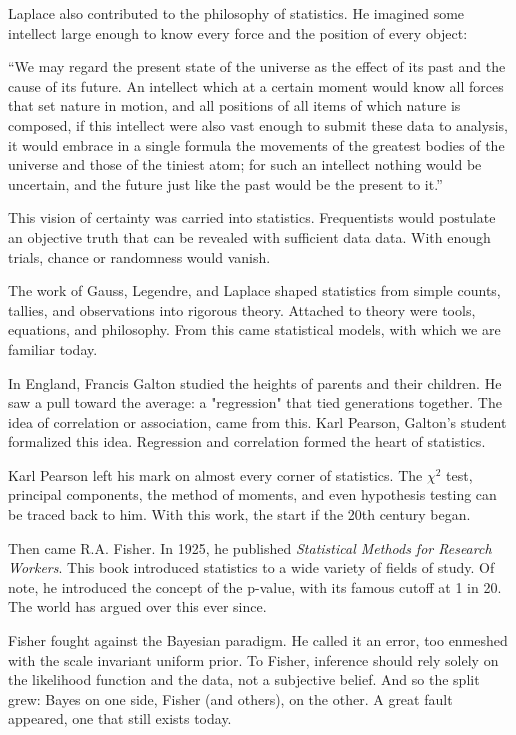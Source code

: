 Laplace also contributed to the philosophy of statistics.  
He imagined some intellect large enough to know every force and the position of every object:

\begin{displayquote} “We may regard the present state of the universe as the effect of its past and the cause of its future. 
    An intellect which at a certain moment would know all forces that set nature in motion, and all positions of all items 
    of which nature is composed, if this intellect were also vast enough to submit these data to analysis, 
    it would embrace in a single formula the movements of the greatest bodies of the universe 
    and those of the tiniest atom; for such an intellect nothing would be uncertain, 
    and the future just like the past would be the present to it.”
\end{displayquote}

This vision of certainty was carried into statistics.  
Frequentists would postulate an objective truth that can be revealed with sufficient data data.  
With enough trials, chance or randomness would vanish.  

The work of Gauss, Legendre, and Laplace shaped statistics from simple counts, tallies, and observations into rigorous theory.  
Attached to theory were tools, equations, and philosophy.  
From this came statistical models, with which we are familiar today. 

In England, Francis Galton studied the heights of parents and their children.  
He saw a pull toward the average: a "regression" that tied generations together\cite{fienberg_review_1992}.  
The idea of correlation or association, came from this.  
Karl Pearson, Galton's student formalized this idea\cite{stanton_galton_2001}.  
Regression and correlation formed the heart of statistics\cite{stanton_galton_2001}.

Karl Pearson left his mark on almost every corner of statistics.  
The \(\chi^2\) test, principal components, the method of moments, and even hypothesis testing can be traced back to him.  
With this work, the start if the 20th century began.  

Then came R.A. Fisher.  In 1925, he published \emph{Statistical Methods for Research Workers}.  
This book introduced statistics to a wide variety of fields of study.  
Of note, he introduced the concept of the p-value, with its famous cutoff at 1 in 20.  
The world has argued over this ever since\cite{ranstam_why_2012}.

Fisher fought against the Bayesian paradigm.  He called it an error, too enmeshed with the scale invariant uniform prior\cite{zabell_fisher_2022}.  
To Fisher, inference should rely solely on the likelihood function and the data, not a subjective belief.  
And so the split grew: Bayes on one side, Fisher (and others), on the other.  
A great fault appeared, one that still exists today.  

